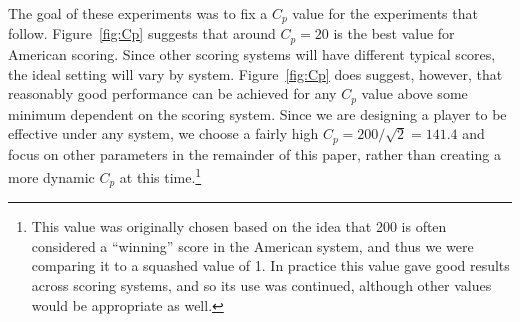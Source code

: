 \documentclass[letterpaper]{article}
\begin{document}
The goal of these experiments was to fix a $C_p$ value for the experiments that follow. Figure~\ref{fig:Cp} suggests that around $C_p = 20$ is the best value for American scoring. Since other scoring systems will have different typical scores, the ideal setting will vary by system. Figure~\ref{fig:Cp} does suggest, however, that reasonably good performance can be achieved for any $C_p$ value above some minimum dependent on the scoring system. Since we are designing a player to be effective under any system, we choose a fairly high $C_p = 200 / \sqrt{2} = 141.4$ and focus on other parameters in the remainder of this paper, rather than creating a more dynamic $C_p$ at this time.\footnote{This value was originally chosen based on the idea that 200 is often considered a ``winning'' score in the American system, and thus we were comparing it to a squashed value of 1. In practice this value gave good results across scoring systems, and so its use was continued, although other values would be appropriate as well.} 


\end{document}

